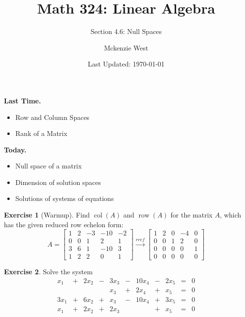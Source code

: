 \documentclass{beamer}
\newcommand{\fn}{\insertframenumber}
\newcommand{\col}{\operatorname{col}}
\newcommand{\row}{\operatorname{row}}
\theoremstyle{definition}
\newtheorem{exercise}{Exercise}
\begin{document}
	\title{Math 324: Linear Algebra}
	\subtitle{Section 4.6: Null Spaces}
	\author{Mckenzie West}
	\date{Last Updated: \today}
\begin{frame}
\maketitle
\end{frame}

\begin{frame}{\insertframenumber}
	\begin{block}{\textbf{Last Time.}}
	\begin{itemize}[label=--]
		\item Row and Column Spaces
		\item Rank of a Matrix
	\end{itemize}
	\end{block}
	\begin{block}{\textbf{Today.}}
		\begin{itemize}[label=--]
			\item Null space of a matrix
			\item Dimension of solution spaces
			\item Solutions of systems of equations
		\end{itemize}
	\end{block}
\end{frame}
\begin{frame}{\fn}
	\begin{exercise}[Warmup]\label{first}
		Find $\col(A)$ and $\row(A)$ for the matrix $A$, which has the given reduced row echelon form:
			\[A=\left[\begin{array}{rrrrr}
			1 & 2 & -3 & -10 & -2 \\
			0 & 0 & 1 & 2 & 1 \\
			3 & 6 & 1 & -10 & 3 \\
			1 & 2 & 2 & 0 & 1
			\end{array}\right]\xrightarrow{rref}
			\left[\begin{array}{rrrrr}
			1 & 2 & 0 & -4 & 0 \\
			0 & 0 & 1 & 2 & 0 \\
			0 & 0 & 0 & 0 & 1 \\
			0 & 0 & 0 & 0 & 0
			\end{array}\right]\]
	\end{exercise}
\end{frame}
\begin{frame}{\fn}
	\begin{exercise}\label{second}
		Solve the system
			\[\begin{array}{rcrcrcrcrcl}
			x_1 &+& 2x_2 &-& 3x_3 & -&10x_4 & -&2x_5&=&0 \\
			 &&&& x_3&+ & 2x_4&+ & x_5&=&0 \\
			3x_1&+ & 6x_2&+ & x_3 & -&10x_4&+ & 3x_5&=&0 \\
			x_1&+ & 2x_2&+ & 2x_3 &  &&+& x_5&=&0
			\end{array}\]
	\end{exercise}
\end{frame}
\end{document}
